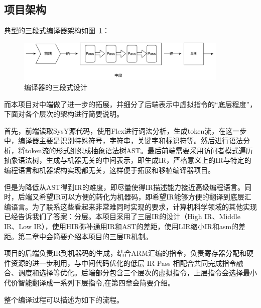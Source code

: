 \subsection{项目架构}

典型的三段式编译器架构如图~\ref{fig:arch}：
\\

\begin{figure}[htb]
  \centering
  \includegraphics[width=0.9\textwidth]{figures/llvm.pdf}
  \caption{编译器的三段式设计}
  \label{fig:arch}
\end{figure}

而本项目对中端做了进一步的拓展，并细分了后端表示中虚拟指令的“底层程度”，下面对各个层次的架构进行简要说明。

首先，前端读取SysY源代码，使用Flex进行词法分析，生成token流，在这一步中，编译器主要是识别特殊符号，字符串，关键字和标识符等。然后进行语法分析，将token流的形式组织成抽象语法树AST。最后前端需要采用访问者模式遍历抽象语法树，生成与机器无关的中间表示，即生成IR，严格意义上的IR与特定的编程语言和机器架构实现都无关，这样便于拓展和移植编译器项目。

但是为降低从AST得到IR的难度，即尽量使得IR描述能力接近高级编程语言。同时，后端又希望IR可以方便的转化为机器码，即希望IR能够方便的翻译到底层汇编语言。为了联系这些看起来非常难同时实现的要求，计算机科学领域的其他实现已经告诉我们了答案：分层。本项目采用了三层IR的设计（High IR、Middle IR、Low IR），使用HIR弥补通用IR和AST的差距，使用LIR缩小IR和asm的差距。第二章中会简要介绍本项目的三层IR机制。

项目的后端负责IR到机器码的生成，结合ARM汇编的指令，负责寄存器分配和硬件资源的进一步利用，与中间代码优化的低层 IR Pass 相配合共同完成指令融合、调度和选择等优化。后端部分包含三个层次的虚拟指令，上层指令会选择最小代价智能翻译成一系列下层指令,在第四章会简要介绍。

整个编译过程可以描述为如下的流程。

